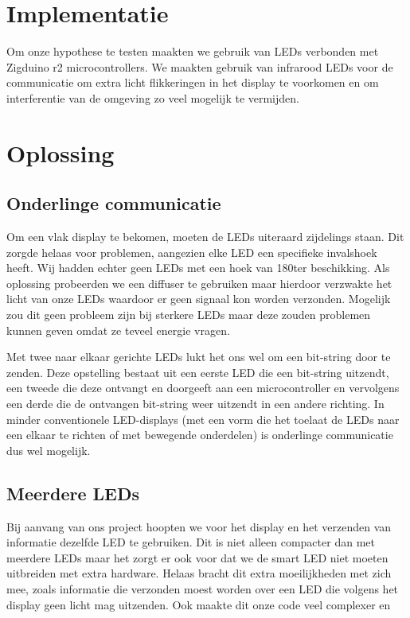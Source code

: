 \documentclass{article}
\begin{document}
\section{Implementatie}
Om onze hypothese te testen maakten we gebruik van LEDs verbonden met Zigduino r2 microcontrollers. We maakten gebruik van infrarood LEDs voor de communicatie om extra licht flikkeringen in het display te voorkomen en om interferentie van de omgeving zo veel mogelijk te vermijden.


\section{Oplossing}

\subsection{Onderlinge communicatie}
Om een vlak display te bekomen, moeten de LEDs uiteraard zijdelings staan. Dit zorgde helaas voor problemen, aangezien elke LED een specifieke invalshoek heeft. Wij hadden echter geen LEDs met een hoek van 180\degree ter beschikking. Als oplossing probeerden we een diffuser te gebruiken maar hierdoor verzwakte het licht van onze LEDs waardoor er geen signaal kon worden verzonden. Mogelijk zou dit geen probleem zijn bij sterkere LEDs maar deze zouden problemen kunnen geven omdat ze teveel energie vragen. 

Met twee naar elkaar gerichte LEDs lukt het ons wel om een bit-string door te zenden. Deze opstelling bestaat uit een eerste LED die een bit-string uitzendt, een tweede die deze ontvangt en doorgeeft aan een microcontroller en vervolgens een derde die de ontvangen bit-string weer uitzendt in een andere richting. In minder conventionele LED-displays (met een vorm die het toelaat de LEDs naar een elkaar te richten of met bewegende onderdelen) is onderlinge communicatie dus wel mogelijk.

\subsection{Meerdere LEDs}
Bij aanvang van ons project hoopten we voor het display en het verzenden van informatie dezelfde LED te gebruiken. Dit is niet alleen compacter dan met meerdere LEDs maar het zorgt er ook voor dat we de smart LED niet moeten uitbreiden met extra hardware. Helaas bracht dit extra moeilijkheden met zich mee, zoals informatie die verzonden moest worden over een LED die volgens het display geen licht mag uitzenden. Ook maakte dit onze code veel complexer en  
\end{document}
